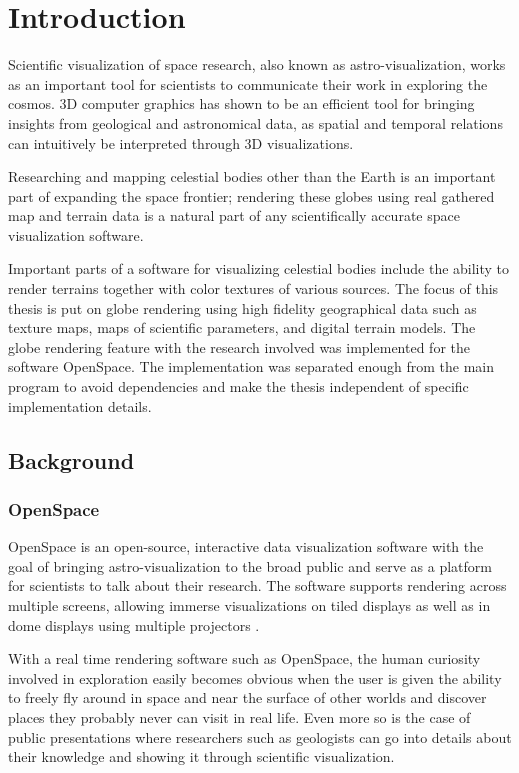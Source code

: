 \chapter{Introduction}

Scientific visualization of space research, also known as astro-visualization, works as an important tool for scientists to communicate their work in exploring the cosmos. 3D computer graphics has shown to be an efficient tool for bringing insights from geological and astronomical data, as spatial and temporal relations can intuitively be interpreted through 3D visualizations.

Researching and mapping celestial bodies other than the Earth is an important part of expanding the space frontier; rendering these globes using real gathered map and terrain data is a natural part of any scientifically accurate space visualization software.

Important parts of a software for visualizing celestial bodies include the ability to render terrains together with color textures of various sources. The focus of this thesis is put on globe rendering using high fidelity geographical data such as texture maps, maps of scientific parameters, and digital terrain models. The globe rendering feature with the research involved was implemented for the software OpenSpace. The implementation was separated enough from the main program to avoid dependencies and make the thesis independent of specific implementation details. 

\section{Background}

\subsection{OpenSpace}

OpenSpace is an open-source, interactive data visualization software with the goal of bringing astro-visualization to the broad public and serve as a platform for scientists to talk about their research. The software supports rendering across multiple screens, allowing immerse visualizations on tiled displays as well as in dome displays using multiple projectors \cite{openspace}.

With a real time rendering software such as OpenSpace, the human curiosity involved in exploration easily becomes obvious when the user is given the ability to freely fly around in space and near the surface of other worlds and discover places they probably never can visit in real life. Even more so is the case of public presentations where researchers such as geologists can go into details about their knowledge and showing it through scientific visualization.

